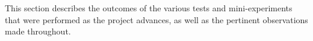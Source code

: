 This section describes the outcomes of the various tests and mini-experiments that were performed as the project advances, as well as the pertinent observations made throughout.  